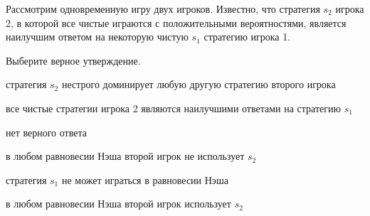 
\begin{question}
Рассмотрим одновременную игру двух игроков. Известно, что стратегия
\(s_2\) игрока 2, в которой все чистые играются с положительными
вероятностями, является наилучшим ответом на некоторую чистую \(s_1\)
стратегию игрока 1.

Выберите верное утверждение.
\begin{answerlist}
  \item стратегия \(s_2\) нестрого доминирует любую другую стратегию второго
игрока
  \item все чистые стратегии игрока 2 являются наилучшими ответами на стратегию
\(s_1\)
  \item нет верного ответа
  \item в любом равновесии Нэша второй игрок не использует \(s_2\)
  \item стратегия \(s_1\) не может играться в равновесии Нэша
  \item в любом равновесии Нэша второй игрок использует \(s_2\)
\end{answerlist}
\end{question}


